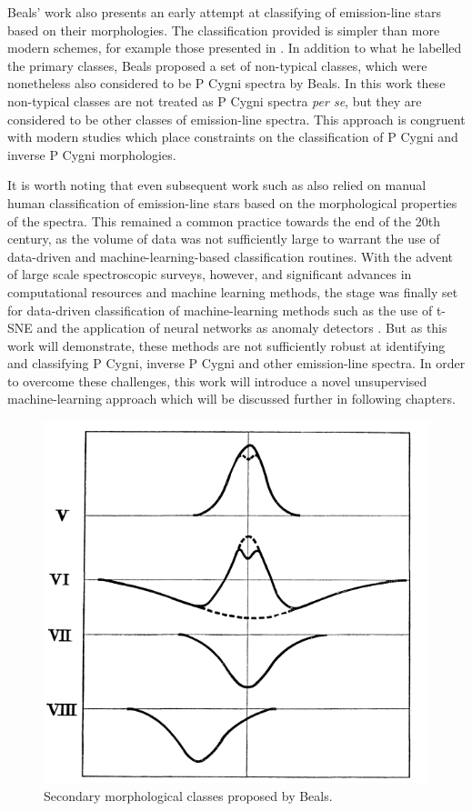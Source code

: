 Beals' work also presents an early attempt at classifying of emission-line stars based on their morphologies. The classification provided is simpler than more modern schemes, for example those presented in \citet{traven2015gaia}. In addition to what he labelled the primary classes, Beals proposed a set of non-typical classes, which were nonetheless also considered to be P Cygni spectra by Beals. In this work these non-typical classes are not treated as P Cygni spectra {\em per se}, but they are considered to be other classes of emission-line spectra. This approach is congruent with modern studies \citep[e.g.,][]{vcotar2021galah, zhang2021catalog, reipurth1996halpha} which place constraints on the classification of P Cygni and inverse P Cygni morphologies. 

It is worth noting that even subsequent work such as \citet{reipurth1996halpha} also relied on manual human classification of emission-line stars based on the morphological properties of the spectra. This remained a common practice towards the end of the 20th century, as the volume of data was not sufficiently large to warrant the use of data-driven and machine-learning-based classification routines. With the advent of large scale spectroscopic surveys, however, and significant advances in computational resources and machine learning methods, the stage was finally set for data-driven classification of machine-learning methods such as the use of t-SNE \citep{traven2017galah} and the application of neural networks as anomaly detectors \citep{vcotar2021galah}. But as this work will demonstrate, these methods are not sufficiently robust at identifying and classifying P Cygni, inverse P Cygni and other emission-line spectra. In order to overcome these challenges, this work will introduce a novel unsupervised machine-learning approach which will be discussed further in following chapters.

\begin{figure}[!htb]
\centering
\includegraphics[scale=.50]{figures/beals class 2.png}
\caption{Secondary morphological classes proposed by Beals.}
\end{figure}

